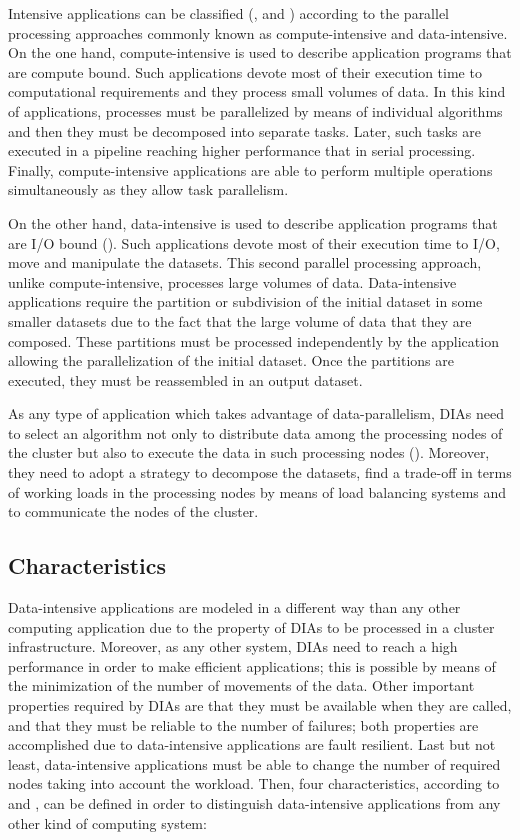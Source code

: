 Intensive applications can be classified (\cite{parallelcomputing}, \cite{computing21} and \cite{dataintensivecomputing}) according to the parallel processing approaches commonly known as compute-intensive and data-intensive. On the one hand, compute-intensive is used to describe application programs that are compute bound. Such applications devote most of their execution time to computational requirements and they process small volumes of data. In this kind of applications, processes must be parallelized by means of individual algorithms and then they must be decomposed into separate tasks. Later, such tasks are executed in a pipeline reaching higher performance that in serial processing. Finally, compute-intensive applications are able to perform multiple operations simultaneously as they allow task parallelism.

On the other hand, data-intensive is used to describe application programs that are I/O bound (\cite{dataintensivecomputingIEEE}). Such applications devote most of their execution time to I/O, move and manipulate the datasets. This second parallel processing approach, unlike compute-intensive, processes large volumes of data. Data-intensive applications require the partition or subdivision of the initial dataset in some smaller datasets due to the fact that the large volume of data that they are composed. These partitions must be processed independently by the application allowing the parallelization of the initial dataset. Once the partitions are executed, they must be reassembled in an output dataset.

As any type of application which takes advantage of data-parallelism, DIAs need to select an algorithm not only to distribute data among the processing nodes of the cluster but also to execute the data in such processing nodes (\cite{terascalechallenge}). Moreover, they need to adopt a strategy to decompose the datasets, find a trade-off in terms of working loads in the processing nodes by means of load balancing systems and to communicate the nodes of the cluster.

\subsection{Characteristics}

Data-intensive applications are modeled in a different way than any other computing application due to the property of DIAs to be processed in a cluster infrastructure. Moreover, as any other system, DIAs need to reach a high performance in order to make efficient applications; this is possible by means of the minimization of the number of movements of the data. Other important properties required by DIAs are that they must be available when they are called, and that they must be reliable to the number of failures; both properties are accomplished due to data-intensive applications are fault resilient. Last but not least, data-intensive applications must be able to change the number of required nodes taking into account the workload. Then, four characteristics, according to \cite{distributedcomputing} and \cite{scalablecomputing}, can be defined in order to distinguish data-intensive applications from any other kind of computing system:

